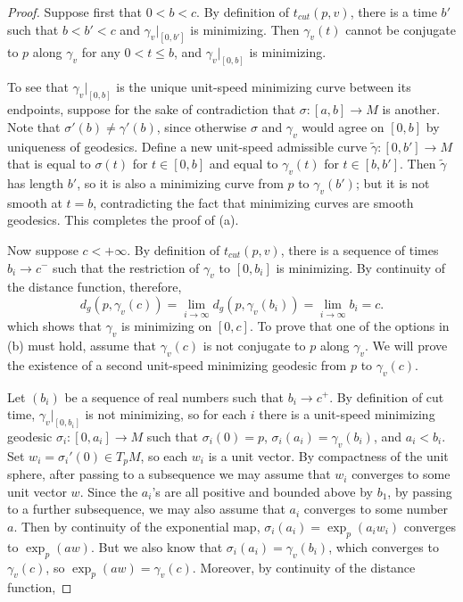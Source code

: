 \begin{proof}
Suppose first that $0<b<c$. By definition of $t_{cut}(p,v)$, there is a time $b'$ such that $b<b'<c$ and $\gamma_v|_{[0,b']}$ is minimizing. Then $\gamma_v(t)$ cannot 
be conjugate to $p$ along $\gamma_v$ for any $0<t\leq b$, and $\gamma_v|_{[0,b]}$ is minimizing.\par
To see that $\gamma_v|_{[0,b]}$ is the unique unit-speed minimizing curve between its endpoints, suppose for the sake of contradiction that $\sigma:[a,b]\to M$ is another. 
Note that $\sigma'(b)\neq\gamma'(b)$, since otherwise $\sigma$ and $\gamma_v$ would agree on $[0,b]$ by uniqueness of geodesics. Define a new unit-speed admissible 
curve $\tilde{\gamma}:[0,b']\to M$ that is equal to $\sigma(t)$ for $t\in[0,b]$ and equal to $\gamma_v(t)$ for $t\in[b,b']$. Then $\tilde{\gamma}$ has length $b'$, 
so it is also a minimizing curve from $p$ to $\gamma_v(b')$; but it is not smooth at $t=b$, contradicting the fact that minimizing curves are smooth geodesics. This 
completes the proof of (a).\par
Now suppose $c<+\infty$. By definition of $t_{cut}(p,v)$, there is a sequence of times $b_i\to c^-$ such that the restriction of $\gamma_v$ to $[0,b_i]$ is minimizing. 
By continuity of the distance function, therefore, 
\[d_g(p,\gamma_v(c))=\lim_{i\to\infty}d_g(p,\gamma_v(b_i))=\lim_{i\to\infty}b_i=c.\]
which shows that $\gamma_v$ is minimizing on $[0,c]$. To prove that one of the options in (b) must hold, assume that $\gamma_v(c)$ is not conjugate to $p$ along $\gamma_v$. 
We will prove the existence of a second unit-speed minimizing geodesic from $p$ to $\gamma_v(c)$.\par
Let $(b_i)$ be a sequence of real numbers such that $b_i\to c^+$. By definition of cut time, $\gamma_v|_{[0,b_i]}$ is not minimizing, so for each $i$ there is a 
unit-speed minimizing geodesic $\sigma_i:[0,a_i]\to M$ such that $\sigma_i(0)=p$, $\sigma_i(a_i)=\gamma_v(b_i)$, and $a_i<b_i$. Set $w_i=\sigma_i'(0)\in T_pM$, so each 
$w_i$ is a unit vector. By compactness of the unit sphere, after passing to a subsequence we may assume that $w_i$ converges to some unit vector $w$. Since the $a_i$'s 
are all positive and bounded above by $b_1$, by passing to a further subsequence, we may also assume that $a_i$ converges to some number $a$. Then by continuity of the 
exponential map, $\sigma_i(a_i)=\exp_p(a_iw_i)$ converges to $\exp_p(aw)$. But we also know that $\sigma_i(a_i)=\gamma_v(b_i)$, which converges to $\gamma_v(c)$, so 
$\exp_p(aw)=\gamma_v(c)$. Moreover, by continuity of the distance function,

\end{proof}
